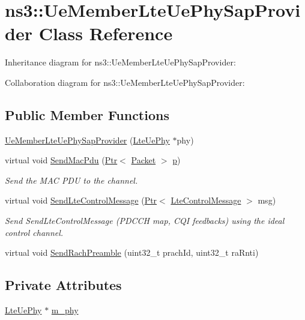 \hypertarget{classns3_1_1UeMemberLteUePhySapProvider}{}\section{ns3\+:\+:Ue\+Member\+Lte\+Ue\+Phy\+Sap\+Provider Class Reference}
\label{classns3_1_1UeMemberLteUePhySapProvider}


Inheritance diagram for ns3\+:\+:Ue\+Member\+Lte\+Ue\+Phy\+Sap\+Provider\+:


Collaboration diagram for ns3\+:\+:Ue\+Member\+Lte\+Ue\+Phy\+Sap\+Provider\+:
\subsection*{Public Member Functions}
\begin{DoxyCompactItemize}
\item 
\hyperlink{classns3_1_1UeMemberLteUePhySapProvider_aec7136badc246688457155f5332ecca1}{Ue\+Member\+Lte\+Ue\+Phy\+Sap\+Provider} (\hyperlink{classns3_1_1LteUePhy}{Lte\+Ue\+Phy} $\ast$phy)
\item 
virtual void \hyperlink{classns3_1_1UeMemberLteUePhySapProvider_a864aa6272a6f5142beaaa5c7e2d59d76}{Send\+Mac\+Pdu} (\hyperlink{classns3_1_1Ptr}{Ptr}$<$ \hyperlink{classns3_1_1Packet}{Packet} $>$ \hyperlink{lte__link__budget__x2__handover__measures_8m_ac9de518908a968428863f829398a4e62}{p})
\begin{DoxyCompactList}\small\item\em Send the M\+AC P\+DU to the channel. \end{DoxyCompactList}\item 
virtual void \hyperlink{classns3_1_1UeMemberLteUePhySapProvider_a1261f22798b64c02daae037bacb8df61}{Send\+Lte\+Control\+Message} (\hyperlink{classns3_1_1Ptr}{Ptr}$<$ \hyperlink{classns3_1_1LteControlMessage}{Lte\+Control\+Message} $>$ msg)
\begin{DoxyCompactList}\small\item\em Send Send\+Lte\+Control\+Message (P\+D\+C\+CH map, C\+QI feedbacks) using the ideal control channel. \end{DoxyCompactList}\item 
virtual void \hyperlink{classns3_1_1UeMemberLteUePhySapProvider_a357312436ec659b0093d0ab5ca363bad}{Send\+Rach\+Preamble} (uint32\+\_\+t prach\+Id, uint32\+\_\+t ra\+Rnti)
\end{DoxyCompactItemize}
\subsection*{Private Attributes}
\begin{DoxyCompactItemize}
\item 
\hyperlink{classns3_1_1LteUePhy}{Lte\+Ue\+Phy} $\ast$ \hyperlink{classns3_1_1UeMemberLteUePhySapProvider_a8a80970c0490ee1845f4160615817283}{m\+\_\+phy}
\end{DoxyCompactItemize}


